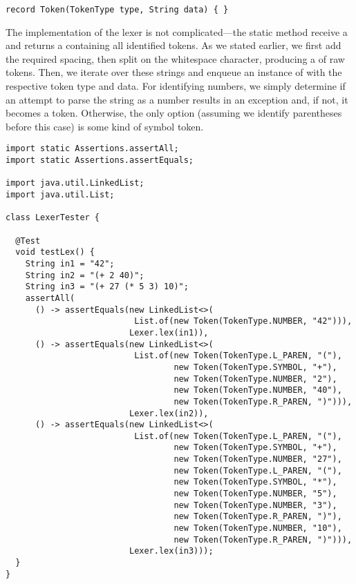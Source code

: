 \begin{lstlisting}[language=MyJava]
record Token(TokenType type, String data) { }
\end{lstlisting}

The implementation of the lexer is not complicated---the static  method receive a  and returns a  containing all identified tokens. As we stated earlier, we first add the required spacing, then split on the whitespace character, producing a  of raw tokens. Then, we iterate over these strings and enqueue an instance of  with the respective token type and data. For identifying numbers, we simply determine if an attempt to parse the string as a number results in an exception and, if not, it becomes a  token. Otherwise, the only option (assuming we identify parentheses before this case) is some kind of symbol token.

\begin{lstlisting}[language=MyJava]
import static Assertions.assertAll;
import static Assertions.assertEquals;

import java.util.LinkedList;
import java.util.List;

class LexerTester {
  
  @Test
  void testLex() {
    String in1 = "42";
    String in2 = "(+ 2 40)";
    String in3 = "(+ 27 (* 5 3) 10)";
    assertAll(
      () -> assertEquals(new LinkedList<>(
                          List.of(new Token(TokenType.NUMBER, "42"))),
                         Lexer.lex(in1)),
      () -> assertEquals(new LinkedList<>(
                          List.of(new Token(TokenType.L_PAREN, "("),
                                  new Token(TokenType.SYMBOL, "+"),
                                  new Token(TokenType.NUMBER, "2"),
                                  new Token(TokenType.NUMBER, "40"),
                                  new Token(TokenType.R_PAREN, ")"))),
                         Lexer.lex(in2)),
      () -> assertEquals(new LinkedList<>(
                          List.of(new Token(TokenType.L_PAREN, "("),
                                  new Token(TokenType.SYMBOL, "+"),
                                  new Token(TokenType.NUMBER, "27"),
                                  new Token(TokenType.L_PAREN, "("),
                                  new Token(TokenType.SYMBOL, "*"),
                                  new Token(TokenType.NUMBER, "5"),
                                  new Token(TokenType.NUMBER, "3"),
                                  new Token(TokenType.R_PAREN, ")"),
                                  new Token(TokenType.NUMBER, "10"),
                                  new Token(TokenType.R_PAREN, ")"))),
                         Lexer.lex(in3)));
  }
}
\end{lstlisting}

